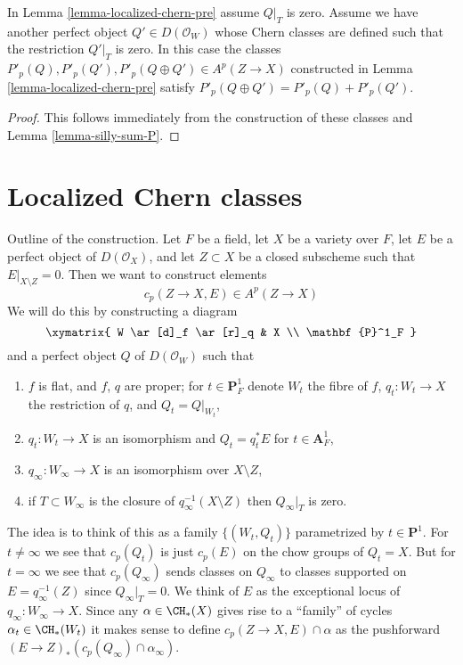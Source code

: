 \begin{lemma}
\label{lemma-localized-chern-pre-sum-P}
In Lemma \ref{lemma-localized-chern-pre} assume $Q|_T$ is zero.
Assume we have another perfect object $Q' \in D(\mathcal{O}_W)$
whose Chern classes are defined such that the restriction $Q'|_T$ is zero.
In this case the classes
$P'_p(Q), P'_p(Q'), P'_p(Q \oplus Q') \in A^p(Z \to X)$
constructed in Lemma \ref{lemma-localized-chern-pre}
satisfy $P'_p(Q \oplus Q') = P'_p(Q) + P'_p(Q')$.
\end{lemma}

\begin{proof}
This follows immediately from the construction of these
classes and Lemma \ref{lemma-silly-sum-P}.
\end{proof}









 
\section{Localized Chern classes}
\label{section-localized-chern}

\noindent
Outline of the construction. Let $F$ be a field,
let $X$ be a variety over $F$, let $E$ be a perfect object of
$D(\mathcal{O}_X)$, and let $Z \subset X$ be a closed subscheme
such that $E|_{X \setminus Z} = 0$. Then we want to construct elements
$$
c_p(Z \to X, E) \in A^p(Z \to X)
$$
We will do this by constructing a diagram
$$
\xymatrix{
W \ar[d]_f \ar[r]_q & X \\
\mathbf{P}^1_F
}
$$
and a perfect object $Q$ of $D(\mathcal{O}_W)$ such that
\begin{enumerate}
\item $f$ is flat, and $f$, $q$ are proper; for $t \in \mathbf{P}^1_F$
denote $W_t$ the fibre of $f$,
$q_t : W_t \to X$ the restriction of $q$, and $Q_t = Q|_{W_t}$,
\item $q_t : W_t \to X$ is an isomorphism and $Q_t = q_t^*E$
for $t \in \mathbf{A}^1_F$,
\item $q_\infty : W_\infty \to X$ is an isomorphism over $X \setminus Z$,
\item if $T \subset W_\infty$ is the closure of 
$q_\infty^{-1}(X \setminus Z)$ then $Q_\infty|_T$ is zero.
\end{enumerate}
The idea is to think of this as a family $\{(W_t, Q_t)\}$
parametrized by $t \in \mathbf{P}^1$.
For $t \not = \infty$ we see that $c_p(Q_t)$ is just $c_p(E)$
on the chow groups of $Q_t = X$. But for $t = \infty$ we see that
$c_p(Q_\infty)$ sends classes on $Q_\infty$ to classes supported on
$E = q_\infty^{-1}(Z)$ since $Q_\infty|_T = 0$.
We think of $E$ as the exceptional locus of $q_\infty : W_\infty \to X$.
Since any $\alpha \in \CH_*(X)$ gives rise to a ``family''
of cycles $\alpha_t \in \CH_*(W_t)$ it makes sense to define
$c_p(Z \to X, E) \cap \alpha$ as
the pushforward $(E \to Z)_*(c_p(Q_\infty) \cap \alpha_\infty)$.

